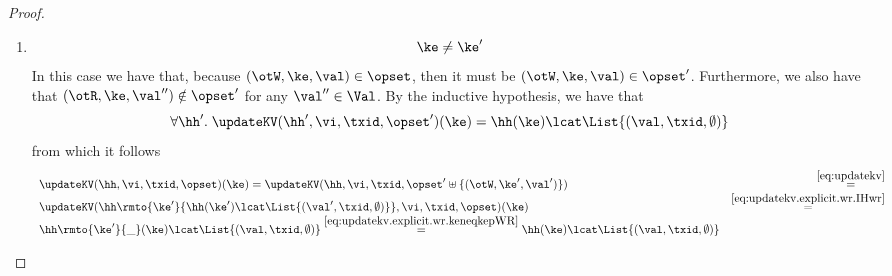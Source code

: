 \begin{proof}
\begin{enumerate}
\begin{itemize}
\begin{enumerate}
			\item 
			\begin{equation}
			\ke \neq \ke'
			\label{eq:updatekv.explicit.wr.keneqkepWR}
			\end{equation}
			In this case we have that, because $(\otW, \ke, \val) \in \opset$, then it must 
			be $(\otW, \ke, \val) \in \opset'$. Furthermore, we also have that $(\otR, \ke, \val'') \notin \opset'$ 
			for any $\val'' \in \Val$. By the inductive hypothesis, we have that 
			\begin{equation}
			\forall \hh'.\; \updateKV(\hh', \vi, \txid, \opset')(\ke) = \hh(\ke) \lcat \List{(\val, \txid, \emptyset)}
			\label{eq:updatekv.explicit.wr.IHwr}
			\end{equation}
			from which it follows 
			\[
			\begin{array}{lr}
			\updateKV(\hh, \vi, \txid, \opset)(\ke) = \updateKV(\hh, \vi, \txid, \opset' \uplus \{(\otW,\ke', \val')\}) &\stackrel{\eqref{eq:updatekv}}{=}\\
			\updateKV(\hh\rmto{\ke'}{\hh(\ke') \lcat \List{(\val', \txid, \emptyset)}}, \vi, \txid, \opset)(\ke) &\stackrel{\eqref{eq:updatekv.explicit.wr.IHwr}}{=}\\
			\hh\rmto{\ke'}{\_}(\ke) \lcat \List{(\val, \txid, \emptyset)} \stackrel{\eqref{eq:updatekv.explicit.wr.keneqkepWR}}{=} \hh(\ke) \lcat \List{(\val, \txid, \emptyset)}
			\end{array}
			\]
			\end{enumerate}
		\end{itemize}
		

\end{enumerate}
\end{proof}
